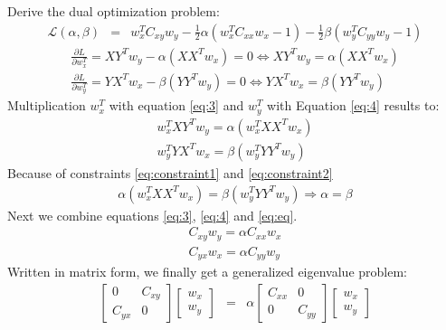 \documentclass[a4paper, 12pt, titlepage]{article}
\begin{document}
Derive the dual optimization problem: \newline
\begin{eqnarray*}
  \mathcal{L}(\alpha, \beta) &=& w^{T}_{x} C_{xy}w_y - \frac{1}{2} \alpha (w^T_xC_{xx}w_x-1) -\frac{1}{2} \beta (w^T_yC_{yy}w_y-1)
  \end{eqnarray*}
\begin{eqnarray}
  \frac{\partial L}{\partial w^T_x} = XY^Tw_y - \alpha( XX^Tw_x ) = 0  \Leftrightarrow XY^Tw_y = \alpha( XX^Tw_x ) \label{eq:3} \\
  \frac{\partial L}{\partial w^T_y} = YX^Tw_x - \beta ( YY^Tw_y) = 0 \Leftrightarrow  YX^Tw_x = \beta ( YY^Tw_y) \label{eq:4}
\end{eqnarray}
Multiplication $w^T_x$ with equation \eqref{eq:3} and $w^T_y$ with Equation \eqref{eq:4} results to:
\begin{eqnarray*}
  w^T_xXY^Tw_y = \alpha( w^T_xXX^Tw_x ) \\
  w^T_yYX^Tw_x = \beta ( w^T_yYY^Tw_y) 
\end{eqnarray*}
Because of constraints \eqref{eq:constraint1} and \eqref{eq:constraint2} 
\begin{eqnarray}
  \alpha( w_x^TXX^Tw_x )=\beta ( w^T_yYY^Tw_y)  \Rightarrow \alpha = \beta \label{eq:eq}
\end{eqnarray}
Next we combine equations \eqref{eq:3}, \eqref{eq:4} and \eqref{eq:eq}.
\begin{eqnarray*}
  C_{xy}w_y = \alpha C_{xx}  w_x \\
  C_{yx}w_x = \alpha C_{yy}  w_y
\end{eqnarray*}
Written in matrix form, we finally get a generalized eigenvalue problem: \newline \newline
\begin{eqnarray}
\begin{bmatrix} 0 & C_{xy} \\ C_{yx} & 0 \end{bmatrix}
\begin{bmatrix} w_x \\ w_y \end{bmatrix} 
&=&  \alpha
\begin{bmatrix} C_{xx} & 0 \\ 0 & C_{yy} \end{bmatrix}
\begin{bmatrix} w_x \\ w_y \end{bmatrix} \label{eq:maeq}
\end{eqnarray}
\end{document}
